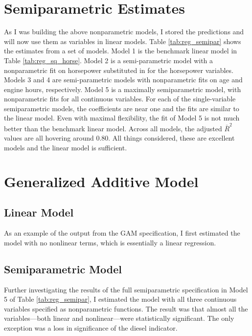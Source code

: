  

\pagebreak
\section{Semiparametric Estimates}

As I was building the above nonparametric models, 
I stored the predictions and will now use them as variables in 
linear models. 
Table \ref{tab:reg_semipar} 
shows the estimates from a set of models. 
Model 1 is the benchmark linear model in 
Table \ref{tab:reg_sq_horse}. 
Model 2 is a semi-parametric model
with a nonparametric fit on horsepower
substituted in for the horsepower variables.
Models 3 and 4 are semi-parametric models
with nonparametric fits on age and engine hours, respectively.
Model 5 is a maximally semiparametric model, 
with nonparametric fits for all continuous variables. 
For each of the single-variable semiparametric models, 
the coefficients are near one
and the fits are similar to the linear model. 
Even with maximal flexibility, the fit of Model 5
is not much better than the benchmark linear model. 
Across all models, the adjusted $\bar{R}^2$ values are all hovering around 0.80. 
All things considered, these are excellent models
and the linear model is sufficient.







\pagebreak
\section{Generalized Additive Model}

\subsection{Linear Model}

As an example of the output from the GAM specification, 
I first estimated the model with no nonlinear terms, 
which is essentially a linear regression. 



\pagebreak
\subsection{Semiparametric Model}


Further investigating the results of the full semiparametric specification
in Model 5 of Table \ref{tab:reg_semipar},
I estimated the model with all three continuous variables specified as nonparametric functions. 
The result was that 
almost all the variables---both linear and nonlinear---were 
statistically significant. 
The only exception was a loss in significance of the diesel indicator. 


